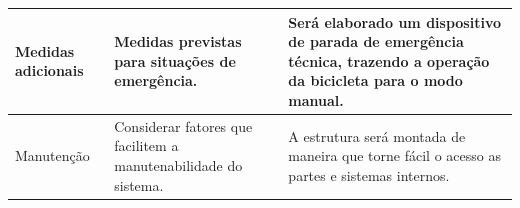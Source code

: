 \begin{table}[!htb]
\begin{tabular}{|M{2,5cm} | M{4,5cm} | M{9cm}|}
		\hline
		Medidas adicionais & Medidas previstas para situações de emergência. & Será elaborado um dispositivo de parada de emergência técnica, trazendo a operação da bicicleta para o modo manual. \\
		\hline
		Manutenção & Considerar fatores que facilitem a manutenabilidade do sistema. & A estrutura será montada de maneira que torne fácil o acesso as partes e sistemas internos. \\
		\hline
	\end{tabular}
	\label{tabela_normas}
\end{table}

